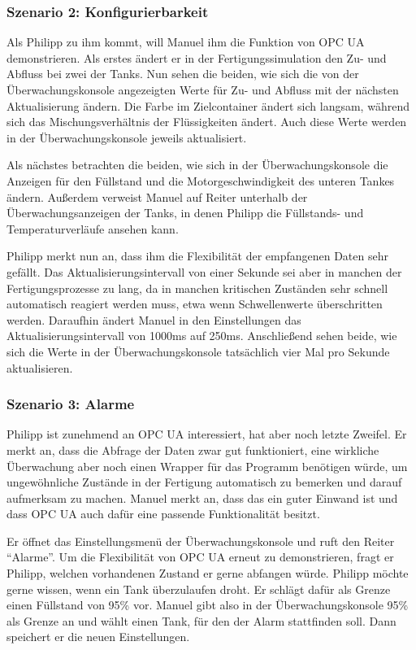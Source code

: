 \documentclass[parskip=full]{scrartcl}
\begin{document}
\subsubsection{Szenario 2: Konfigurierbarkeit}
Als Philipp zu ihm kommt, will Manuel ihm die Funktion von OPC UA demonstrieren.
Als erstes ändert er in der Fertigungssimulation den Zu- und Abfluss bei zwei der Tanks. Nun sehen die beiden, wie
sich die von der Überwachungskonsole angezeigten Werte für Zu- und Abfluss mit der nächsten Aktualisierung ändern. Die
Farbe im Zielcontainer ändert sich langsam, während sich das Mischungsverhältnis der Flüssigkeiten ändert. Auch diese
Werte werden in der Überwachungskonsole jeweils aktualisiert.

Als nächstes betrachten die beiden, wie sich in der Überwachungskonsole die Anzeigen für den Füllstand und die Motorgeschwindigkeit des unteren Tankes ändern.
Außerdem verweist Manuel auf Reiter unterhalb der Überwachungsanzeigen der Tanks,
in denen Philipp die Füllstands- und Temperaturverläufe ansehen kann.

Philipp merkt nun an, dass ihm die Flexibilität der empfangenen Daten sehr gefällt. Das Aktualisierungsintervall von
einer Sekunde sei aber in manchen der Fertigungsprozesse zu lang, da in manchen kritischen Zuständen sehr schnell
automatisch reagiert werden muss, etwa wenn Schwellenwerte überschritten werden. Daraufhin ändert Manuel in den
Einstellungen das Aktualisierungsintervall von 1000ms auf 250ms. Anschließend sehen beide, wie sich die Werte in der
Überwachungskonsole tatsächlich vier Mal pro Sekunde aktualisieren.

\subsubsection{Szenario 3: Alarme}
Philipp ist zunehmend an OPC UA interessiert, hat aber noch letzte Zweifel. Er merkt an, dass die Abfrage der Daten
zwar gut funktioniert, eine wirkliche \"Uberwachung aber noch einen \gls{Wrapper} f\"ur das Programm ben\"otigen w\"urde,
um ungew\"ohnliche Zust\"ande in der Fertigung automatisch zu bemerken und darauf aufmerksam zu machen.
Manuel merkt an, dass das ein guter Einwand ist und dass OPC UA auch daf\"ur eine passende Funktionalit\"at besitzt.

Er \"offnet das Einstellungsmen\"u der \"Uberwachungskonsole und ruft den Reiter "`Alarme"'. Um die Flexibilit\"at
von OPC UA erneut zu demonstrieren, fragt er Philipp, welchen vorhandenen Zustand er gerne abfangen w\"urde. Philipp möchte gerne
wissen, wenn ein Tank \"uberzulaufen droht. Er schl\"agt daf\"ur als Grenze einen F\"ullstand von 95\% vor.
Manuel gibt also in der \"Uberwachungskonsole 95\% als Grenze an und w\"ahlt einen Tank, f\"ur den der Alarm stattfinden soll.
Dann speichert er die neuen Einstellungen.
\end{document}

